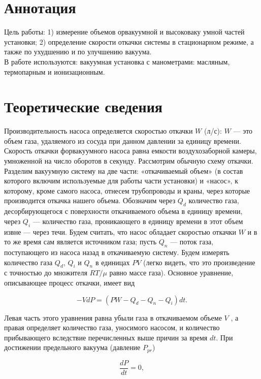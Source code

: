 \documentclass[a4paper,12pt]{article} %
\begin{document}
\section{Аннотация}
Цель работы: 1) измерение объемов орвакуумной и высоковаку
умной частей установки; 2) определение скорости откачки системы в
стационарном режиме, а также по ухудшению и по улучшению вакуума. \\
В работе используются: вакуумная установка с манометрами: масляным, термопарным и ионизационным. 
\section{Теоретические сведения}

	Производительность насоса определяется скоростью откачки $W$ (л/с): $W$ — это объем газа, удаляемого из сосуда при данном давлении за единицу времени. Скорость откачки форвакуумного насоса равна емкости воздухозаборной камеры, умноженной на число оборотов в секунду.
Рассмотрим обычную схему откачки. Разделим вакуумную систему на две части: «откачиваемый объем» (в состав которого включим используемые для работы части установки) и «насос», к которому, кроме самого насоса, отнесем трубопроводы и краны, через которые
производится откачка нашего объема. Обозначим через $Q_d$ количество газа, десорбирующегося с поверхности откачиваемого объема в единицу времени, через $Q_i$ — количество газа, проникающего в единицу времени в этот объем извне — через течи. Будем считать, что насос обладает скоростью откачки $W$ и в то же время сам является источником газа; пусть $Q_n$ — поток газа, поступающего из насоса назад в откачиваемую систему. Будем измерять количество газа $Q_d$, $Q_i$ и $Q_n$ в единицах $PV$ (легко видеть, что это произведение с точностью до множителя $RT/ \mu$ равно массе газа). Основное уравнение, описывающее процесс откачки, имеет вид

\begin{equation}
\label{otkachka}
	-VdP=(PW-Q_d-Q_n-Q_i)dt.
\end{equation}

Левая часть этого уравнения равна убыли газа в откачиваемом объеме $V$ , а правая определяет количество газа, уносимого насосом, и количество прибывающего вследствие перечисленных выше причин
за время $dt$. При достижении предельного вакуума (давление $P_{pr}$)

\begin{equation}
\label{predel_1}
	\frac{dP}{dt}=0,
\end{equation}
\end{document}
